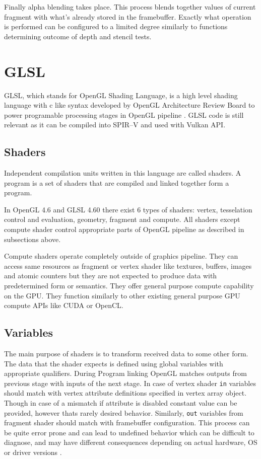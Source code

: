 Finally alpha blending takes place. This process blends together values of current fragment with what's already stored in the framebuffer.
Exactly what operation is performed can be configured to a limited degree similarly to functions determining outcome of depth and stencil tests.

\section{GLSL}

GLSL, which stands for OpenGL Shading Language, is a high level shading language with c like syntax developed by OpenGL Architecture Review Board to power programable processing stages in OpenGL pipeline \cite{glslspec}.
GLSL code is still relevant as it can be compiled into SPIR--V and used with Vulkan API.

\subsection*{Shaders}

Independent compilation units written in this language are called shaders. A program is a set of
shaders that are compiled and linked together form a program.

In OpenGL 4.6 and GLSL 4.60 there exist 6 types of shaders: vertex, tesselation control and evaluation, geometry, fragment and compute.
All shaders except compute shader control appropriate parts of OpenGL pipeline as described in subsections above. 

Compute shaders operate completely outside of graphics pipeline. They can access same resources as fragment or vertex shader like textures, buffers, images and atomic counters
but they are not expected to produce data with predetermined form or semantics. They offer general purpose compute capability on the GPU. 
They function similarly to other existing general purpose GPU compute APIs like CUDA or OpenCL.

\subsection{Variables}

The main purpose of shaders is to transform received data to some other form. The data that the shader expects is defined using global variables with appropriate qualifiers.
During Program linking OpenGL matches outputs from previous stage with inputs of the next stage. 
In case of vertex shader \texttt{in} variables should match with vertex attribute definitions specified in vertex array object.
Though in case of a mismatch if attribute is disabled constant value can be provided, however thats rarely desired behavior.
Similarly, \texttt{out} variables from fragment shader should match with framebuffer configuration.
This process can be quite error prone and can lead to undefined behavior which can be difficult to diagnose, and may have different consequences depending on actual hardware, OS or driver versions
\cite{glslspec}.

